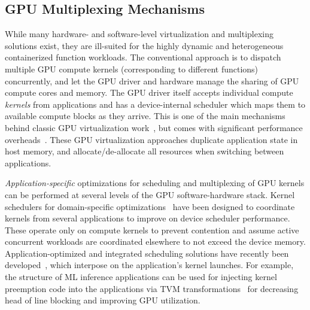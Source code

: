 \subsection{GPU Multiplexing Mechanisms}

While many hardware- and software-level virtualization and multiplexing solutions exist, they are ill-suited for the highly dynamic and heterogeneous containerized function workloads.
The conventional approach is to dispatch multiple GPU compute kernels (corresponding to different functions) concurrently, and let the GPU driver and hardware manage the sharing of GPU compute cores and memory.
The GPU driver itself accepts individual compute \emph{kernels} from applications and has a device-internal scheduler which maps them to available compute blocks as they arrive. 
This is one of the main mechanisms behind classic GPU virtualization work~\cite{duato2010rcuda, yu2019automatic, hong2017gpu}, but comes with significant performance overheads~\cite{yu2017full}. 
These GPU virtualization approaches duplicate application state in host memory, and allocate/de-allocate all resources when switching between applications. 


\emph{Application-specific} optimizations for scheduling and multiplexing of GPU kernels can be performed at several levels of the GPU software-hardware stack. 
Kernel schedulers for domain-specific optimizations~\cite{strati2024orion,chen2017effisha,kim2020navigator,gu2023fast} have been designed to coordinate kernels from several applications to improve on device scheduler performance.
These operate only on compute kernels to prevent contention and assume active concurrent workloads are coordinated elsewhere to not exceed the device memory. 
Application-optimized and integrated scheduling solutions have recently been developed~\cite{ng2023paella,pemberton2022kernel,strati2024orion}, which interpose on the application's kernel launches.
For example, the structure of ML inference applications can be used for injecting kernel preemption code into the applications via TVM transformations~\cite{han2022microsecond} for decreasing head of line blocking and improving GPU utilization.


